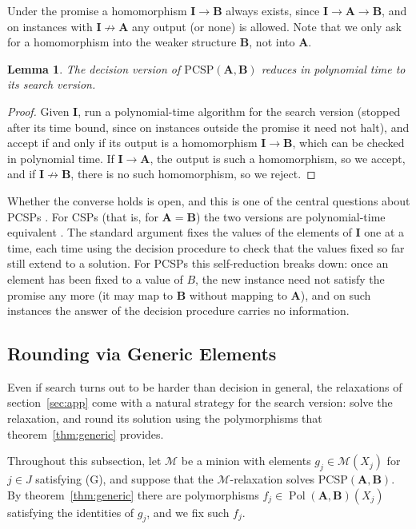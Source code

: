 \documentclass[11pt]{article}
\theoremstyle{plain}
\newtheorem{lemma}[theorem]{Lemma}
\theoremstyle{definition}
\newcommand{\Pol}{\operatorname{Pol}}
\newcommand{\bA}{\mathbf{A}}
\newcommand{\bB}{\mathbf{B}}
\newcommand{\bI}{\mathbf{I}}
\newcommand{\M}{\mathscr{M}}
\newcommand{\PCSP}{\mathrm{PCSP}}
\begin{document}
Under the promise a homomorphism $\bI\to\bB$ always exists, since $\bI\to\bA\to\bB$, and on instances with $\bI\not\to\bA$ any output (or none) is allowed. Note that we only ask for a homomorphism into the weaker structure $\bB$, not into $\bA$.

\begin{lemma}\label{lem:dec-search}
The decision version of $\PCSP(\bA,\bB)$ reduces in polynomial time to its search version.
\end{lemma}

\begin{proof}
Given $\bI$, run a polynomial-time algorithm for the search version (stopped after its time bound, since on instances outside the promise it need not halt), and accept if and only if its output is a homomorphism $\bI\to\bB$, which can be checked in polynomial time. If $\bI\to\bA$, the output is such a homomorphism, so we accept, and if $\bI\not\to\bB$, there is no such homomorphism, so we reject.
\end{proof}

Whether the converse holds is open, and this is one of the central questions about PCSPs \cite{BGWZ,Lar}. For CSPs (that is, for $\bA=\bB$) the two versions are polynomial-time equivalent \cite{Coh}. The standard argument fixes the values of the elements of $\bI$ one at a time, each time using the decision procedure to check that the values fixed so far still extend to a solution. For PCSPs this self-reduction breaks down: once an element has been fixed to a value of $B$, the new instance need not satisfy the promise any more (it may map to $\bB$ without mapping to $\bA$), and on such instances the answer of the decision procedure carries no information.

\subsection{Rounding via Generic Elements}\label{sec:round-generic}

Even if search turns out to be harder than decision in general, the relaxations of section~\ref{sec:app} come with a natural strategy for the search version: solve the relaxation, and round its solution using the polymorphisms that theorem~\ref{thm:generic} provides.

Throughout this subsection, let $\M$ be a minion with elements $g_j\in\M(X_j)$ for $j\in J$ satisfying (G), and suppose that the $\M$-relaxation solves $\PCSP(\bA,\bB)$. By theorem~\ref{thm:generic} there are polymorphisms $f_j\in\Pol(\bA,\bB)(X_j)$ satisfying the identities of $g_j$, and we fix such $f_j$.
\end{document}

